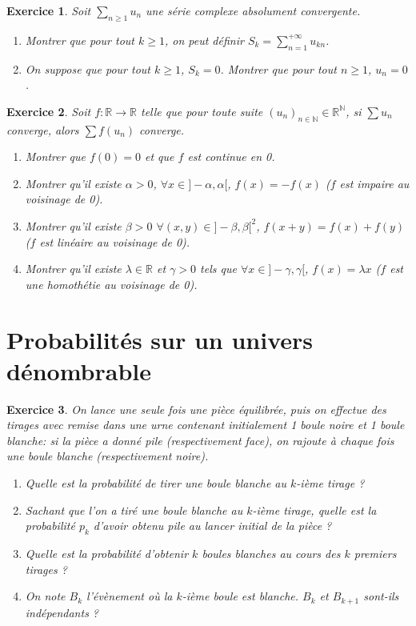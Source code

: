 \documentclass[12pt]{article}
\newtheorem{exercise}{Exercice}[section]
\theoremstyle{remark}
\theoremstyle{remark}
\newcommand{\R}{\mathbb{R}}
\newcommand{\N}{\mathbb{N}}
\begin{document}
\begin{exercise}
	Soit $\sum_{n\geqslant1}u_{n}$ une série complexe absolument convergente.
	\begin{enumerate}
		\item Montrer que pour tout $k\geqslant1$, on peut définir $S_{k}=\sum_{n=1}^{+\infty}u_{kn}$.
		\item On suppose que pour tout $k\geqslant1$, $S_{k}=0$. Montrer que
		pour tout $n\geqslant1$, $u_{n}=0$.
	\end{enumerate}
\end{exercise}

\begin{exercise}
	Soit $f:\R\to\R$ telle que pour toute suite $(u_{n})_{n\in\N}\in\R^{\N}$, si
$\sum u_{n}$ converge, alors $\sum f(u_{n})$ converge.
\begin{enumerate}
	\item Montrer que $f(0)=0$ et que $f$ est continue en 0.
	\item Montrer qu'il existe $\alpha>0$, $\forall x\in]-\alpha,\alpha[$,
	$f(x)=-f(x)$ ($f$ est impaire au voisinage de 0).
	\item Montrer qu'il existe $\beta>0$ $\forall(x,y)\in]-\beta,\beta[^{2}$,
	$f(x+y)=f(x)+f(y)$ ($f$ est linéaire au voisinage de 0).
	\item Montrer qu'il existe $\lambda\in\R$ et $\gamma>0$ tels que $\forall
	x\in]-\gamma,\gamma[$, $f(x)=\lambda x$ ($f$ est une homothétie au voisinage
	de 0).
\end{enumerate}
\end{exercise}

\cleardoublepage
\section{Probabilités sur un univers dénombrable}

\begin{exercise}
	On lance une seule fois une pièce équilibrée, puis on effectue des tirages
	avec remise dans une urne contenant initialement 1 boule noire et 1 boule
	blanche: si la pièce a donné pile (respectivement face), on rajoute à chaque
	fois une boule blanche (respectivement noire).
	\begin{enumerate}
		\item Quelle est la probabilité de tirer une boule blanche au $k$-ième
		tirage ?
		\item Sachant que l'on a tiré une boule blanche au $k$-ième tirage,
		quelle est la probabilité $p_{k}$ d'avoir obtenu pile au lancer initial
		de la pièce ?
		\item Quelle est la probabilité d'obtenir $k$ boules blanches au cours
		des $k$ premiers tirages ?
		\item On note $B_{k}$ l'évènement où la $k$-ième boule est blanche.
		$B_{k}$ et $B_{k+1}$ sont-ils indépendants ?
	\end{enumerate}
\end{exercise}
\end{document}
